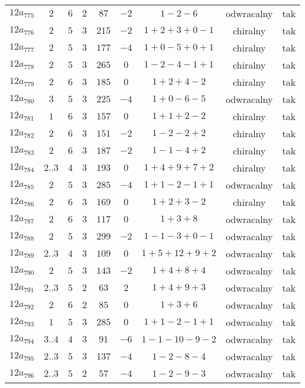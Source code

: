 \begin{longtable}{ccccccccc}
$12a_{775}$ & $2$ & $6$ & $2$ & $87$ & $-2$ & $1-2-6$ & odwracalny & tak \\
$12a_{776}$ & $2$ & $5$ & $3$ & $215$ & $-2$ & $1+2+3+0-1$ & chiralny & tak \\
$12a_{777}$ & $2$ & $5$ & $3$ & $177$ & $-4$ & $1+0-5+0+1$ & chiralny & tak \\
$12a_{778}$ & $2$ & $5$ & $3$ & $265$ & $0$ & $1-2-4-1+1$ & chiralny & tak \\
$12a_{779}$ & $2$ & $6$ & $3$ & $185$ & $0$ & $1+2+4-2$ & chiralny & tak \\
$12a_{780}$ & $3$ & $5$ & $3$ & $225$ & $-4$ & $1+0-6-5$ & odwracalny & tak \\
$12a_{781}$ & $1$ & $6$ & $3$ & $157$ & $0$ & $1+1+2-2$ & chiralny & tak \\
$12a_{782}$ & $2$ & $6$ & $3$ & $151$ & $-2$ & $1-2-2+2$ & chiralny & tak \\
$12a_{783}$ & $2$ & $6$ & $3$ & $187$ & $-2$ & $1-1-4+2$ & chiralny & tak \\
$12a_{784}$ & $2..3$ & $4$ & $3$ & $193$ & $0$ & $1+4+9+7+2$ & chiralny & tak \\
$12a_{785}$ & $2$ & $5$ & $3$ & $285$ & $-4$ & $1+1-2-1+1$ & odwracalny & tak \\
$12a_{786}$ & $2$ & $6$ & $3$ & $169$ & $0$ & $1+2+3-2$ & chiralny & tak \\
$12a_{787}$ & $2$ & $6$ & $3$ & $117$ & $0$ & $1+3+8$ & odwracalny & tak \\
$12a_{788}$ & $2$ & $5$ & $3$ & $299$ & $-2$ & $1-1-3+0-1$ & odwracalny & tak \\
$12a_{789}$ & $2..3$ & $4$ & $3$ & $109$ & $0$ & $1+5+12+9+2$ & odwracalny & tak \\
$12a_{790}$ & $2$ & $5$ & $3$ & $143$ & $-2$ & $1+4+8+4$ & odwracalny & tak \\
$12a_{791}$ & $2..3$ & $5$ & $2$ & $63$ & $2$ & $1+4+9+3$ & odwracalny & tak \\
$12a_{792}$ & $2$ & $6$ & $2$ & $85$ & $0$ & $1+3+6$ & odwracalny & tak \\
$12a_{793}$ & $1$ & $5$ & $3$ & $285$ & $0$ & $1+1-2-1+1$ & odwracalny & tak \\
$12a_{794}$ & $3..4$ & $4$ & $3$ & $91$ & $-6$ & $1-1-10-9-2$ & odwracalny & tak \\
$12a_{795}$ & $2..3$ & $5$ & $3$ & $137$ & $-4$ & $1-2-8-4$ & odwracalny & tak \\
$12a_{796}$ & $2..3$ & $5$ & $2$ & $57$ & $-4$ & $1-2-9-3$ & odwracalny & tak \\

\end{longtable}

